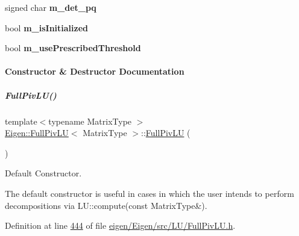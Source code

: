 \begin{DoxyCompactItemize}
\item 
\mbox{\label{group___l_u___module_a0ef883d134b4b6b03453b87d9d27cc54}} 
signed char {\bfseries m\+\_\+det\+\_\+pq}
\item 
\mbox{\label{group___l_u___module_aba2dab012169688780fc50509d38a3f5}} 
bool {\bfseries m\+\_\+is\+Initialized}
\item 
\mbox{\label{group___l_u___module_a9d5ab07b54c7bb0cb9e2e13e770308cd}} 
bool {\bfseries m\+\_\+use\+Prescribed\+Threshold}
\end{DoxyCompactItemize}


\paragraph{Constructor \& Destructor Documentation}
\mbox{\label{group___l_u___module_af225528d1c6e623a2b1dce091907d13e}} 
\subparagraph{\texorpdfstring{Full\+Piv\+L\+U()}{FullPivLU()}\hspace{0.1cm}{\footnotesize\ttfamily [1/8]}}
{\footnotesize\ttfamily template$<$typename Matrix\+Type $>$ \\
\hyperlink{group___l_u___module_class_eigen_1_1_full_piv_l_u}{Eigen\+::\+Full\+Piv\+LU}$<$ Matrix\+Type $>$\+::\hyperlink{group___l_u___module_class_eigen_1_1_full_piv_l_u}{Full\+Piv\+LU} (\begin{DoxyParamCaption}{ }\end{DoxyParamCaption})}



Default Constructor. 

The default constructor is useful in cases in which the user intends to perform decompositions via L\+U\+::compute(const Matrix\+Type\&). 

Definition at line \hyperlink{eigen_2_eigen_2src_2_l_u_2_full_piv_l_u_8h_source_l00444}{444} of file \hyperlink{eigen_2_eigen_2src_2_l_u_2_full_piv_l_u_8h_source}{eigen/\+Eigen/src/\+L\+U/\+Full\+Piv\+L\+U.\+h}.

